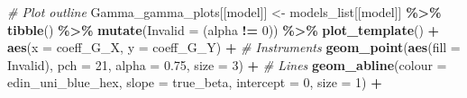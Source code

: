 \documentclass[
]{article}
\newenvironment{Shaded}{\begin{snugshade}}{\end{snugshade}}
\newcommand{\AttributeTok}[1]{\textcolor[rgb]{0.13,0.29,0.53}{#1}}
\newcommand{\CommentTok}[1]{\textcolor[rgb]{0.56,0.35,0.01}{\textit{#1}}}
\newcommand{\DecValTok}[1]{\textcolor[rgb]{0.00,0.00,0.81}{#1}}
\newcommand{\FloatTok}[1]{\textcolor[rgb]{0.00,0.00,0.81}{#1}}
\newcommand{\FunctionTok}[1]{\textcolor[rgb]{0.13,0.29,0.53}{\textbf{#1}}}
\newcommand{\NormalTok}[1]{#1}
\newcommand{\OtherTok}[1]{\textcolor[rgb]{0.56,0.35,0.01}{#1}}
\newcommand{\SpecialCharTok}[1]{\textcolor[rgb]{0.81,0.36,0.00}{\textbf{#1}}}
\begin{document}
\begin{Shaded}
\begin{Highlighting}[]
  
  \CommentTok{\# Plot outline}
\NormalTok{  Gamma\_gamma\_plots[[model]] }\OtherTok{\textless{}{-}}\NormalTok{ models\_list[[model]] }\SpecialCharTok{\%\textgreater{}\%}
    \FunctionTok{tibble}\NormalTok{() }\SpecialCharTok{\%\textgreater{}\%} 
    \FunctionTok{mutate}\NormalTok{(}\AttributeTok{Invalid =}\NormalTok{ (alpha }\SpecialCharTok{!=} \DecValTok{0}\NormalTok{)) }\SpecialCharTok{\%\textgreater{}\%}
    \FunctionTok{plot\_template}\NormalTok{() }\SpecialCharTok{+}
    \FunctionTok{aes}\NormalTok{(}\AttributeTok{x =}\NormalTok{ coeff\_G\_X,}
        \AttributeTok{y =}\NormalTok{ coeff\_G\_Y) }\SpecialCharTok{+}
    \CommentTok{\# Instruments}
    \FunctionTok{geom\_point}\NormalTok{(}\FunctionTok{aes}\NormalTok{(}\AttributeTok{fill =}\NormalTok{ Invalid),}
               \AttributeTok{pch =} \DecValTok{21}\NormalTok{,}
               \AttributeTok{alpha =} \FloatTok{0.75}\NormalTok{,}
               \AttributeTok{size =} \DecValTok{3}\NormalTok{) }\SpecialCharTok{+}
    \CommentTok{\# Lines}
    \FunctionTok{geom\_abline}\NormalTok{(}\AttributeTok{colour =}\NormalTok{ edin\_uni\_blue\_hex,}
                \AttributeTok{slope =}\NormalTok{ true\_beta,}
                \AttributeTok{intercept =} \DecValTok{0}\NormalTok{,}
                \AttributeTok{size =} \DecValTok{1}\NormalTok{) }\SpecialCharTok{+}
    

\end{Highlighting}
\end{Shaded}
\end{document}
